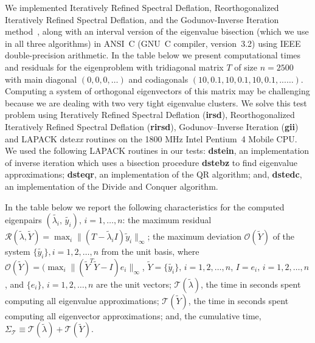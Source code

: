 \documentclass{report}
\begin{document}
We implemented Iteratively Refined Spectral Deflation, Reorthogonalized
Iteratively Refined Spectral Deflation, and the Godunov-Inverse Iteration
method~\cite{matsekh_imacs}, along with an interval version of
the eigenvalue bisection (which we use in all three algorithms)
in ANSI~C (GNU~C compiler, version~3.2) using IEEE
double-precision arithmetic. In the table below we present
computational times and residuals for the eigenproblem with
tridiagonal matrix $T$ of size $n=2500$ with main diagonal $(0,
0, 0, \ldots)$ and codiagonals $(10, 0.1, 10, 0.1, 10, 0.1,
...\ldots)$. Computing a system of orthogonal eigenvectors of
this matrix may be challenging because we are dealing with two very
tight eigenvalue clusters. We solve this test problem using
Iteratively Refined Spectral Deflation (\textbf{irsd}), Reorthogonalized
Iteratively Refined Spectral Deflation (\textbf{rirsd}),
Godunov--Inverse Iteration (\textbf{gii}) and
LAPACK dste\emph{xx} routines on the 1800 MHz
Intel\textregistered{} Pentium~4 Mobile\textregistered{} CPU\@.
We used the following LAPACK routines in our tests:
\textbf{dstein}, an implementation of inverse iteration which
uses a bisection procedure \textbf{dstebz} to find eigenvalue
approximations; \textbf{dsteqr}, an implementation of the QR
algorithm; and, \textbf{dstedc}, an implementation of the Divide
and Conquer algorithm.

In the table below we report the following characteristics for
the computed eigenpairs
$(\tilde{\lambda_i},\,\tilde{y_i}),\,i=1,\ldots, n$: the maximum
residual $\mathcal{R}(\tilde{\lambda}, \tilde{Y}) = \max_i \| (T
- \tilde{\lambda}_i I) \tilde{y}_i \|_\infty$; the maximum
deviation $\mathcal{O}(\tilde{Y})$ of the system
$\{\tilde{y_i}\}, i = 1, 2, \ldots, n$ from the unit basis, where
$\mathcal{O}(\tilde{Y})=(\max_i \|(\tilde{Y}^T \tilde{Y} - I)
e_i\|_\infty$, $\tilde{Y} = \{\tilde{y_i}\},\, i = 1, 2, \ldots,
n$, $I = {e_i},\, i = 1, 2, \ldots, n$, and $\{e_i\},\, i = 1, 2,
\ldots, n$ are the unit vectors; $\mathcal{T}( \tilde{\lambda})$,
the time in seconds spent computing all eigenvalue
approximations; $\mathcal{T}( \tilde{Y})$, the time in seconds
spent computing all eigenvector approximations; and, the
cumulative time, $\Sigma_{\mathcal{T}} \equiv
\mathcal{T}(\tilde{\lambda}) + \mathcal{T}( \tilde{Y})$.
\end{document}
